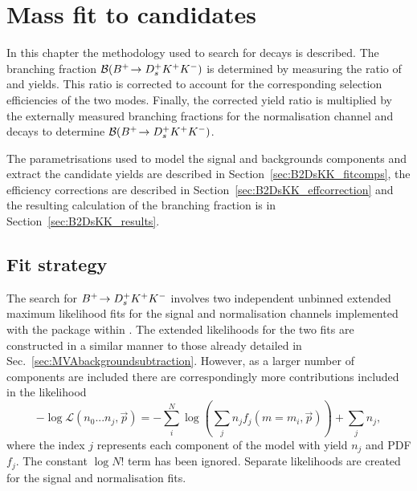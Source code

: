 \chapter{Mass fit to \decay{\Bp}{\Dsp\Kp\Km} candidates} 
\label{ch:B2DsKK}

\minitoc

In this chapter the methodology used to search for \decay{\Bp}{\Dsp\Kp\Km} decays is described.
The branching fraction ${\mathcal{B}}({{{B}^+}}\!\rightarrow {\ensuremath{{D}^+_{s}}}{\ensuremath{{K}^+}}{\ensuremath{{K}^-}})$ is determined by measuring the ratio of \decay{\Bp}{\Dsp\Kp\Km} and \decay{\Bp}{\Dsp\Dzb} yields. 
This ratio is corrected to account for the corresponding selection efficiencies of the two modes. Finally, the corrected yield ratio is multiplied by the externally measured branching fractions for the normalisation channel \decay{\Bp}{\Dsp\Dzb} and \decay{\Dzb}{\Kp\Km} decays to determine ${\mathcal{B}}({{{B}^+}}\!\rightarrow {\ensuremath{{D}^+_{s}}}{\ensuremath{{K}^+}}{\ensuremath{{K}^-}})$.




The parametrisations used to model the signal and backgrounds components and extract the candidate yields are described in Section~\ref{sec:B2DsKK_fitcomps}, the efficiency corrections are described in Section~\ref{sec:B2DsKK_effcorrection} and the resulting calculation of the branching fraction is in Section~\ref{sec:B2DsKK_results}.



\section{Fit strategy}
\label{sec:B2DsKK_fitstrategy}
The search for ${{{B}^+}}\!\rightarrow {\ensuremath{{D}^+_{s}}}{\ensuremath{{K}^+}}{\ensuremath{{K}^-}}$ involves two independent unbinned extended maximum likelihood fits for the signal and normalisation channels implemented with the \roofit package within \root. The extended likelihoods for the two fits are constructed in a similar manner to those already detailed in Sec.~\ref{sec:MVAbackgroundsubtraction}. However, as a larger number of components are included there are correspondingly more contributions included in the likelihood
\begin{equation}
-\log\mathcal{L}(n_{0}...n_{j},\vec{p}) = -\sum_{i}^{N} \log \left( \sum_{j} n_{j} f_{j}(m=m_{i},\vec{p}) \right) + \sum_{j}n_{j},
\end{equation}
where the index $j$ represents each component of the model with yield $n_{j}$ and PDF $f_{j}$. The constant $\log{N!}$ term has been ignored. Separate likelihoods are created for the signal and normalisation fits.



